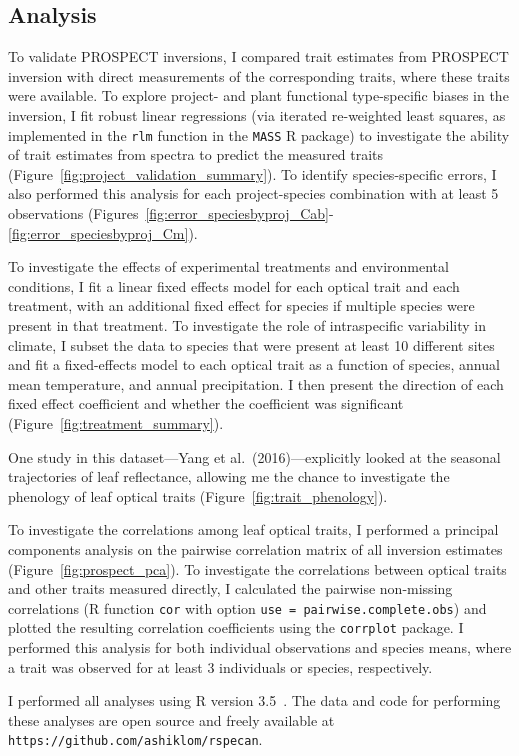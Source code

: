 \subsection{Analysis}

To validate PROSPECT inversions, I compared trait estimates from PROSPECT inversion with direct measurements of the corresponding traits, where these traits were available.
To explore project- and plant functional type-specific biases in the inversion, I fit robust linear regressions (via iterated re-weighted least squares, as implemented in the \texttt{rlm} function in the \texttt{MASS} R package) to investigate the ability of trait estimates from spectra to predict the measured traits (Figure~\ref{fig:project_validation_summary}).
To identify species-specific errors, I also performed this analysis for each project-species combination with at least 5 observations (Figures~\ref{fig:error_speciesbyproj_Cab}-\ref{fig:error_speciesbyproj_Cm}).

To investigate the effects of experimental treatments and environmental conditions, I fit a linear fixed effects model for each optical trait and each treatment, with an additional fixed effect for species if multiple species were present in that treatment.
To investigate the role of intraspecific variability in climate, I subset the data to species that were present at least 10 different sites and fit a fixed-effects model to each optical trait as a function of species, annual mean temperature, and annual precipitation.
I then present the direction of each fixed effect coefficient and whether the coefficient was significant (Figure~\ref{fig:treatment_summary}).

One study in this dataset---Yang et al.~(2016)\nocite{yang_2016_seasonal}---explicitly looked at the seasonal trajectories of leaf reflectance, allowing me the chance to investigate the phenology of leaf optical traits (Figure~\ref{fig:trait_phenology}).

To investigate the correlations among leaf optical traits, I performed a principal components analysis on the pairwise correlation matrix of all inversion estimates (Figure~\ref{fig:prospect_pca}).
To investigate the correlations between optical traits and other traits measured directly, I calculated the pairwise non-missing correlations (R function \texttt{cor} with option \texttt{use = pairwise.complete.obs}) and plotted the resulting correlation coefficients using the \texttt{corrplot} package.
I performed this analysis for both individual observations and species means, where a trait was observed for at least 3 individuals or species, respectively.

I performed all analyses using R version 3.5~\cite{rstats}.
The data and code for performing these analyses are open source and freely available at \texttt{https://github.com/ashiklom/rspecan}.
